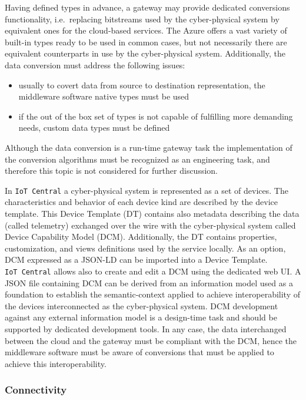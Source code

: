 \documentclass{jacsart}
\providecommand{\tightlist} { \setlength{\itemsep}{0pt}\setlength{\parskip}{0pt}}
\begin{document}
Having defined types in advance, a gateway may provide dedicated conversions functionality, i.e.~replacing bitstreams used by the cyber-physical system by equivalent ones for the cloud-based services. The Azure offers a vast variety of built-in types ready to be used in common cases, but not necessarily there are equivalent counterparts in use by the cyber-physical system. Additionally, the data conversion must address the following issues:

\begin{itemize}
  \tightlist
  \item
        usually to covert data from source to destination representation, the
        middleware software native types must be used
  \item
        if the out of the box set of types is not capable of fulfilling more
        demanding needs, custom data types must be defined
\end{itemize}

Although the data conversion is a run-time gateway task the
implementation of the conversion algorithms must be recognized as an
engineering task, and therefore this topic is not considered for further
discussion.

In \texttt{IoT\ Central} a cyber-physical system is represented as a set
of devices. The characteristics and behavior of each device kind are
described by the device template. This Device Template (DT) contains
also metadata describing the data (called telemetry) exchanged over the
wire with the cyber-physical system called Device Capability Model
(DCM). Additionally, the DT contains properties, customization, and
views definitions used by the service locally. As an option, DCM
expressed as a JSON-LD can be imported into a Device Template.
\texttt{IoT\ Central} allows also to create and edit a DCM using the
dedicated web UI. A JSON file containing DCM can be derived from an
information model used as a foundation to establish the semantic-context
applied to achieve interoperability of the devices interconnected as the
cyber-physical system. DCM development against any external information
model is a design-time task and should be supported by dedicated
development tools. In any case, the data interchanged between the cloud
and the gateway must be compliant with the DCM, hence the middleware
software must be aware of conversions that must be applied to achieve
this interoperability.

\hypertarget{connectivity}{%
  \subsubsection{Connectivity}\label{connectivity}}
\end{document}
